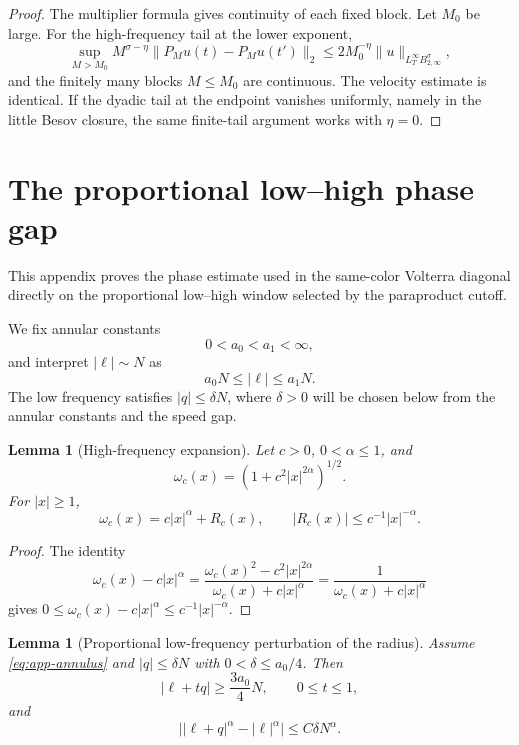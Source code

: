 \documentclass[10pt]{amsart}
\numberwithin{equation}{section}
\theoremstyle{plain}
\newtheorem{lemma}[theorem]{Lemma}
\theoremstyle{definition}
\theoremstyle{remark}
\newcommand{\Btwo}{B_{2,\infty}}
\begin{document}
\begin{proof}
The multiplier formula gives continuity of each fixed block.  Let $M_0$ be large.  For the high-frequency tail at the lower exponent,
\[
\sup_{M>M_0}M^{\sigma-\eta}\|P_Mu(t)-P_Mu(t')\|_2
\le 2M_0^{-\eta}\|u\|_{L_T^\infty\Btwo^\sigma},
\]
and the finitely many blocks $M\le M_0$ are continuous.  The velocity estimate is identical.  If the dyadic tail at the endpoint vanishes uniformly, namely in the little Besov closure, the same finite-tail argument works with $\eta=0$.
\end{proof}


\section{The proportional low--high phase gap}\label{app:phase-gap}

This appendix proves the phase estimate used in the same-color Volterra diagonal directly on the proportional low--high window selected by the paraproduct cutoff.

We fix annular constants
\[
0<a_0<a_1<\infty,
\]
and interpret $|\ell|\sim N$ as
\begin{equation}\label{eq:app-annulus}
 a_0N\le |\ell|\le a_1N.
\end{equation}
The low frequency satisfies $|q|\le\delta N$, where $\delta>0$ will be chosen below from the annular constants and the speed gap.

\begin{lemma}[High-frequency expansion]\label{lem:app-high-frequency}
Let $c>0$, $0<\alpha\le 1$, and
\[
 \omega_c(x)=(1+c^2|x|^{2\alpha})^{1/2}.
\]
For $|x|\ge 1$,
\begin{equation}\label{eq:app-high-frequency}
 \omega_c(x)=c|x|^\alpha+R_c(x),\qquad |R_c(x)|\le c^{-1}|x|^{-\alpha}.
\end{equation}
\end{lemma}

\begin{proof}
The identity
\[
 \omega_c(x)-c|x|^\alpha
 =\frac{\omega_c(x)^2-c^2|x|^{2\alpha}}{\omega_c(x)+c|x|^\alpha}
 =\frac{1}{\omega_c(x)+c|x|^\alpha}
\]
gives $0\le \omega_c(x)-c|x|^\alpha\le c^{-1}|x|^{-\alpha}$.
\end{proof}

\begin{lemma}[Proportional low-frequency perturbation of the radius]\label{lem:app-low-perturb}
Assume \eqref{eq:app-annulus} and $|q|\le\delta N$ with $0<\delta\le a_0/4$.  Then
\begin{equation}\label{eq:app-segment-lower}
 |\ell+tq|\ge \frac{3a_0}{4}N,\qquad 0\le t\le 1,
\end{equation}
and
\begin{equation}\label{eq:app-low-perturb}
 \bigl||\ell+q|^\alpha-|\ell|^\alpha\bigr|
 \le C\delta N^\alpha.
\end{equation}
\end{lemma}
\end{document}
